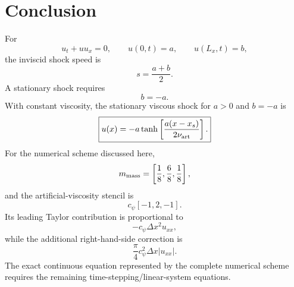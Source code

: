 \documentclass{mooiman_memo}
\begin{document}
\section{Conclusion}
%
For
%
\[
u_t+uu_x=0,
\qquad
u(0,t)=a,
\qquad
u(L_x,t)=b,
\]
%
the inviscid shock speed is
%
\begin{equation}
    \boxed{s=\frac{a+b}{2}}.
\end{equation}
%
A stationary shock requires
%
\begin{equation}
    \boxed{b=-a}.
\end{equation}
%
With constant viscosity, the stationary viscous shock for $a>0$ and
$b=-a$ is
%
\begin{equation}
    \boxed{
    u(x)=
    -a\tanh\left[
        \frac{a(x-x_s)}{2\nu_{\rm art}}
    \right].
    }
\end{equation}
%
For the numerical scheme discussed here,
%
\[
m_{\rm mass}
=
\left[
\frac18,\frac68,\frac18
\right],
\]
%
and the artificial-viscosity stencil is
%
\[
c_\psi[-1,2,-1].
\]
%
Its leading Taylor contribution is proportional to
%
\[
-c_\psi\Delta x^2u_{xx},
\]
%
while the additional right-hand-side correction is
%
\[
\frac{\pi}{4}c_\psi^2\Delta x|u_{xx}|.
\]
%
The exact continuous equation represented by the complete numerical
scheme requires the remaining time-stepping/linear-system equations.
\end{document}
